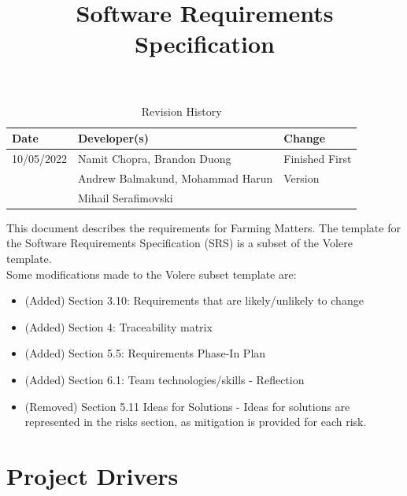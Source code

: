 \documentclass{article}
\title{Software Requirements Specification\\\progname}
\author{\authname}
\date{}
\begin{document}
\begin{table}[hp]
\caption{Revision History} \label{TblRevisionHistory}
\begin{tabularx}{\textwidth}{llX}
\toprule
\textbf{Date} & \textbf{Developer(s)} & \textbf{Change}\\
\midrule
10/05/2022 & Namit Chopra, Brandon Duong  & Finished First\\
 & Andrew Balmakund, Mohammad Harun &  Version\\
 & Mihail Serafimovski & \\
\bottomrule
\end{tabularx}
\end{table}

\newpage

\maketitle

\newpage

\tableofcontents
\listoftables
\listoffigures

\newpage


This document describes the requirements for Farming Matters. The template for the Software
Requirements Specification (SRS) is a subset of the Volere ~\citep{RobertsonAndRobertson2012} template. \newline \\ Some modifications made to the Volere subset template are:
\begin{itemize}
    \item (Added) Section 3.10: Requirements that are likely/unlikely to change
    \item (Added) Section 4: Traceability matrix
    \item (Added) Section 5.5: Requirements Phase-In Plan
    \item (Added) Section 6.1: Team technologies/skills - Reflection
    \item (Removed) Section 5.11 Ideas for Solutions - Ideas for solutions are represented in the risks section, as mitigation is provided for each risk.
\end{itemize}



\section{Project Drivers}
\end{document}

